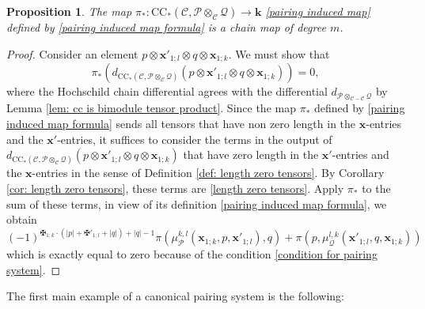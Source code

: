 \documentclass[11pt]{amsproc}
\def\K{{\mathbf{k}}}
\def\cP{\mathcal{P}}
\def\cQ{\mathcal{Q}}
\def\cc{\mathcal{C}}
\def\r#1{\mathrm{#1}}
\newtheorem{prop}[lem]{Proposition}
\theoremstyle{remark}
\numberwithin{equation}{section}
\begin{document}
\begin{prop}\label{prop: pairing induced map}
The map $\pi_{*}: \r{CC}_{*}(\cc, \cP \otimes_{\cc} \cQ) \to \K$ \eqref{pairing induced map} defined by \eqref{pairing induced map formula} is a chain map of degree $m$.
\end{prop}
\begin{proof}
Consider an element $p \otimes \mathbf{x}'_{1;l} \otimes q \otimes \mathbf{x}_{1; k}$.
We must show that 
\[
\pi_{*}(d_{\r{CC}_{*}(\cc, \cP \otimes_{\cc} \cQ)} (p \otimes \mathbf{x}'_{1;l} \otimes q \otimes \mathbf{x}_{1; k}))=0,
\]
where the Hochschild chain differential agrees with the differential $d_{\cP \otimes_{\cc-\cc} \cQ}$ by Lemma \ref{lem: cc is bimodule tensor product}.
Since the map $\pi_{*}$ defined by \eqref{pairing induced map formula} sends all tensors that have non zero length in the $\mathbf{x}$-entries and the $\mathbf{x}'$-entries,
it suffices to consider the terms in the output of $d_{\r{CC}_{*}(\cc, \cP \otimes_{\cc} \cQ)} (p \otimes \mathbf{x}'_{1;l} \otimes q \otimes \mathbf{x}_{1; k})$ that have zero length in the $\mathbf{x}'$-entries and the $\mathbf{x}$-entries in the sense of Definition \ref{def: length zero tensors}.
By Corollary \ref{cor: length zero tensors}, 
these terms are \eqref{length zero tensors}.
Apply $\pi_{*}$ to the sum of these terms, in view of its definition \eqref{pairing induced map formula}, we obtain
\begin{equation}
 (-1)^{\maltese_{1;k} \cdot(|p| + \maltese'_{1; l} + |q|) + |q| - 1}  \pi(\mu_{\cP}^{k, l}(\mathbf{x}_{1; k}, p, \mathbf{x}'_{1; l}), q) +\pi(p, \mu^{l, k}_{\cQ}(\mathbf{x}'_{1; l}, q, \mathbf{x}_{1; k}))
 \end{equation}
which is exactly equal to zero because of the condition \eqref{condition for pairing system}.
\end{proof}

The first main example of a canonical pairing system is the following:
\end{document}
